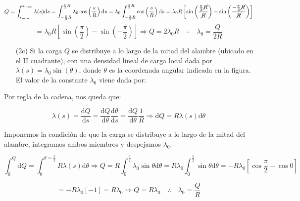 \documentclass[a4paper,10pt]{article}
\begin{document}
\begin{equation*}
    Q=\int_{s_{min}}^{s_{max}}\lambda(s)\mathrm{d}s
    =\int_{-\frac{\pi}{2}R}^{\frac{\pi}{2}R}\lambda_{0}\cos\left(\frac{s}{R}\right)\mathrm{d}s
    =\lambda_{0}\int_{-\frac{\pi}{2}R}^{\frac{\pi}{2}R}\cos\left(\frac{s}{R}\right)\mathrm{d}s
    =\lambda_{0}R\left[\sin\left(\frac{\frac{\pi}{2} \cancel{R}}{\cancel{R}}\right)
    -\sin\left(\frac{-\frac{\pi}{2} \cancel{R}}{\cancel{R}}\right)\right]
\end{equation*}
\begin{equation*}
    =\lambda_{0}R\left[\sin\left(\frac{\pi}{2}\right)-\sin\left(-\frac{\pi}{2}\right)\right]
    \Longrightarrow Q=2\lambda_{0}R\quad\therefore\quad\boxed{\lambda_{0}=\frac{Q}{2R}}
\end{equation*}

\begin{itemize}
    \item[(2c)] Si la carga $Q$ se distribuye a lo largo de la mitad del alambre (ubicado en el II cuadrante),
    con una densidad lineal de carga local dada por $\lambda(s)=\lambda_{0}\sin\left(\theta\right)$, donde $\theta$
    es la coordenada angular indicada en la figura. El valor de la constante $\lambda_{0}$ viene dada por:
\end{itemize}

Por regla de la cadena, nos queda que:

\begin{equation*}
    \lambda(s)=\frac{\mathrm{d}Q}{\mathrm{d}s}=\frac{\mathrm{d}Q}{\mathrm{d}\theta}
    \frac{\mathrm{d}\theta}{\mathrm{d}s}
    =\frac{\mathrm{d}Q}{\mathrm{d}\theta}\frac{1}{R}
    \Longrightarrow\mathrm{d}Q=R\lambda(s)\mathrm{d}\theta
\end{equation*}

Imponemos la condici\'on de que la carga se distribuye a lo largo de la mitad del
alambre, integramos ambos miembros y despejamos $\lambda_{0}$:

\begin{equation*}
    \int_{0}^{Q}\mathrm{d}Q=\int_{0}^{\theta=\frac{\pi}{2}}R\lambda(s)\mathrm{d}\theta
    \Longrightarrow Q=R\int_{0}^{\frac{\pi}{2}}\lambda_{0}\sin\theta\mathrm{d}\theta
    =R\lambda_{0}\int_{0}^{\frac{\pi}{2}}\sin\theta\mathrm{d}\theta
    =-R\lambda_{0}\left[\cos\frac{\pi}{2}-\cos0\right]
\end{equation*}

\begin{equation*}
    =-R\lambda_{0}[-1]
    =R\lambda_{0}
    \Longrightarrow Q=R\lambda_{0}
    \quad\therefore\quad\boxed{\lambda_{0}=\frac{Q}{R}}
\end{equation*}
\end{document}
